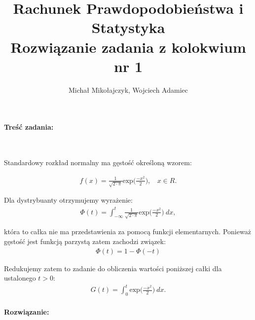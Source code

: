 \documentclass[12pt,oneside,a4paper]{article}
\author{Michał Mikołajczyk, Wojciech Adamiec}
\title{
    \textbf{Rachunek Prawdopodobieństwa i Statystyka}\\
    \large Rozwiązanie zadania z kolokwium nr 1
}
\begin{document}
\maketitle

\paragraph{Treść zadania:}\

Standardowy rozkład normalny ma gęstość określoną wzorem:

\begin{equation}
\begin{aligned}
    f(x) = \frac{1}{\sqrt{2 \cdot \pi}} \text{exp}\Big(\frac{-x^2}{2}\Big), \ \ \ \ x \in R.
\end{aligned}
\end{equation}

Dla dystrybuanty otrzymujemy wyrażenie:
\begin{equation}
\begin{aligned}
    \Phi(t) = \int^{t}_{- \infty } \frac{1}{\sqrt{2 \cdot \pi}} \text{exp}\Big(\frac{-x^2}{2}\Big)\  dx,
\end{aligned}
\end{equation}

która to całka nie ma przedstawienia za pomocą funkcji elementarnych. 
Ponieważ gęstość jest funkcją parzystą zatem zachodzi związek:
\begin{equation}
\begin{aligned}
   \Phi(t) = 1 - \Phi(-t)\label{lemma}
\end{aligned}
\end{equation}

Redukujemy zatem to zadanie do obliczenia wartości poniższej całki dla ustalonego $t>0$:
\begin{equation}
\begin{aligned}
    G(t) = \int^{t}_{0} \text{exp}\Big(\frac{-x^2}{2}\Big)\  dx.\label{task}
\end{aligned}
\end{equation}

\paragraph{Rozwiązanie:}\
\end{document}
